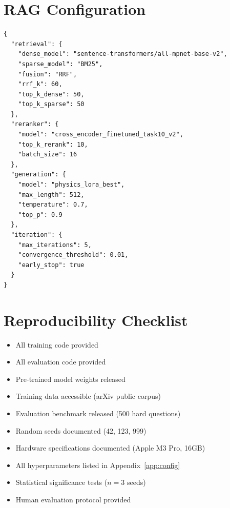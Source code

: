 \documentclass[11pt,a4paper]{article}
\theoremstyle{plain}
\theoremstyle{definition}
\begin{document}
\section{RAG Configuration}
\label{app:rag_config}

\begin{lstlisting}[caption=RAG System Configuration]
{
  "retrieval": {
    "dense_model": "sentence-transformers/all-mpnet-base-v2",
    "sparse_model": "BM25",
    "fusion": "RRF",
    "rrf_k": 60,
    "top_k_dense": 50,
    "top_k_sparse": 50
  },
  "reranker": {
    "model": "cross_encoder_finetuned_task10_v2",
    "top_k_rerank": 10,
    "batch_size": 16
  },
  "generation": {
    "model": "physics_lora_best",
    "max_length": 512,
    "temperature": 0.7,
    "top_p": 0.9
  },
  "iteration": {
    "max_iterations": 5,
    "convergence_threshold": 0.01,
    "early_stop": true
  }
}
\end{lstlisting}

\section{Reproducibility Checklist}
\label{app:reproducibility}

\begin{itemize}[leftmargin=*]
    \item[$\square$] All training code provided
    \item[$\square$] All evaluation code provided
    \item[$\square$] Pre-trained model weights released
    \item[$\square$] Training data accessible (arXiv public corpus)
    \item[$\square$] Evaluation benchmark released (500 hard questions)
    \item[$\square$] Random seeds documented (42, 123, 999)
    \item[$\square$] Hardware specifications documented (Apple M3 Pro, 16GB)
    \item[$\square$] All hyperparameters listed in Appendix~\ref{app:config}
    \item[$\square$] Statistical significance tests ($n=3$ seeds)
    \item[$\square$] Human evaluation protocol provided
\end{itemize}
\end{document}
